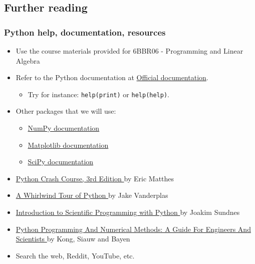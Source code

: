 \subsection{Further reading}
\begin{frame}[fragile]
\frametitle{Python help, documentation, resources}
\begin{itemize}
  \item Use the course materials provided for 6BBR06 - Programming and Linear Algebra
  \item Refer to the Python documentation at \href{https://docs.python.org/3/}{Official documentation}.
  \begin{itemize}
    \item Try for instance: \lstinline$help(print)$ or \lstinline$help(help)$.
  \end{itemize}
  \item Other packages that we will use:
  \begin{itemize}
    \item \href{https://numpy.org/doc/stable/}{NumPy documentation}
    \item \href{https://matplotlib.org/stable/}{Matplotlib documentation}
    \item \href{https://docs.scipy.org/}{SciPy documentation}
  \end{itemize}
  \item \href{https://tue.on.worldcat.org/oclc/1346554335}{Python Crash Course, 3rd Edition \faExternalLink} by Eric Matthes
  \item \href{https://tue.on.worldcat.org/oclc/1023864062}{A Whirlwind Tour of Python \faExternalLink} by Jake Vanderplas
  \item \href{https://tue.on.worldcat.org/oclc/1164494156}{Introduction to Scientific Programming with Python \faExternalLink} by Joakim Sundnes
  \item \href{https://pythonnumericalmethods.berkeley.edu/notebooks/Index.html}{Python Programming And Numerical Methods: A Guide For Engineers And Scientists \faExternalLink} by Kong, Siauw and Bayen
  \item Search the web, Reddit, YouTube, etc.
\end{itemize}
\end{frame}

